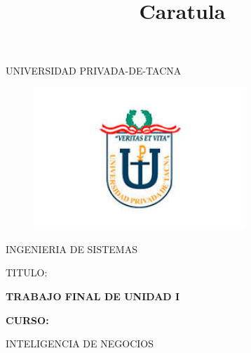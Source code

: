 \documentclass[12pt,letterpaper]{article}
\begin{document}
%


\title{Caratula}

\begin{titlepage}
\begin{center}
\large{UNIVERSIDAD PRIVADA-DE-TACNA}\\
\vspace*{-0.025in}
\begin{figure}[htb]
\begin{center}
\includegraphics[width=8cm]{./Imagenes/logo}
\end{center}
\end{figure}
\vspace*{0.15in}
INGENIERIA DE SISTEMAS  \\

\vspace*{0.5in}
\begin{large}
TITULO:\\
\end{large}

\vspace*{0.1in}
\begin{Large}
\textbf{TRABAJO FINAL DE UNIDAD I} \\
\end{Large}

\vspace*{0.3in}
\begin{Large}
\textbf{CURSO:} \\
\end{Large}

\vspace*{0.1in}
\begin{large}
INTELIGENCIA DE NEGOCIOS\\
\end{large}


\end{center}
\end{titlepage}
\end{document}
